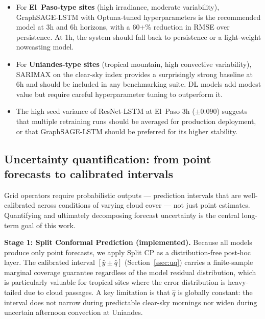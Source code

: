 \begin{itemize}
  \item For \textbf{El~Paso-type sites} (high irradiance, moderate variability),
        GraphSAGE-LSTM with Optuna-tuned hyperparameters is the recommended model
        at 3h and 6h horizons, with a 60+\% reduction in RMSE over persistence.
        At 1h, the system should fall back to persistence or a light-weight
        nowcasting model.

  \item For \textbf{Uniandes-type sites} (tropical mountain, high convective
        variability), SARIMAX on the clear-sky index provides a surprisingly strong
        baseline at 6h and should be included in any benchmarking suite. DL models
        add modest value but require careful hyperparameter tuning to outperform it.

  \item The high seed variance of ResNet-LSTM at El~Paso 3h ($\pm 0.090$) suggests
        that multiple retraining runs should be averaged for production deployment,
        or that GraphSAGE-LSTM should be preferred for its higher stability.
\end{itemize}

\subsection{Uncertainty quantification: from point forecasts to calibrated intervals}
\label{ssec:uq_discussion}

Grid operators require probabilistic outputs — prediction intervals that are
well-calibrated across conditions of varying cloud cover — not just point
estimates. Quantifying and ultimately decomposing forecast uncertainty is the
central long-term goal of this work.

\textbf{Stage 1: Split Conformal Prediction (implemented).}
Because all models produce only point forecasts, we apply Split CP
\cite{vovk2005,angelopoulos2023} as a distribution-free post-hoc layer.
The calibrated interval $[\hat{y} \pm \hat{q}]$ (Section~\ref{ssec:uq})
carries a finite-sample marginal coverage guarantee regardless of the model
residual distribution, which is particularly valuable for tropical sites where
the error distribution is heavy-tailed due to cloud passages.
A key limitation is that $\hat{q}$ is globally constant: the interval does not
narrow during predictable clear-sky mornings nor widen during uncertain afternoon
convection at Uniandes.

